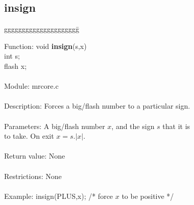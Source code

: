 \pagebreak

\subsection{insign}

\begin{tabbing}
ggggggggggggggggggggg\= \kill


      Function:      \>void {\bf insign}(s,x) \\
                     \>int s; \\
                     \>flash x; \\
      \ \\
      Module:        \>mrcore.c \\
      \ \\
      Description:   \>Forces a big/flash number to a particular sign. \\
      \ \\
      Parameters:    \>A big/flash number $x$, and the sign $s$ that it is \\
                     \>to take. On exit $x=s.|x|$. \\
      \ \\
      Return value:  \>None \\
      \ \\
      Restrictions:  \>None \\
      \ \\
      Example:       \>insign(PLUS,x);   /* force $x$ to be positive */  \\

\end{tabbing}

